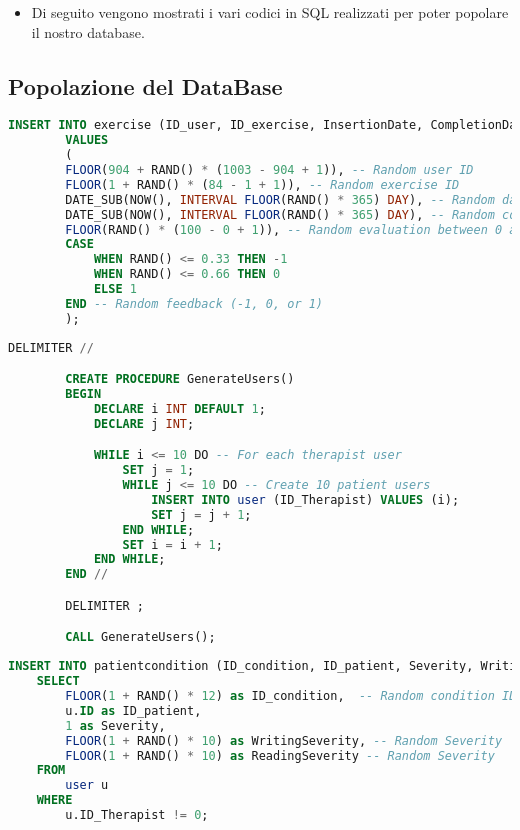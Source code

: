 \documentclass{article}
\begin{document}
    \begin{itemize}
        \item Di seguito vengono mostrati i vari codici in SQL realizzati per poter popolare il nostro database.
    \end{itemize}

    
    \pagebreak

    \subsection{Popolazione del DataBase}

\begin{lstlisting}[language=SQL, caption=Generazione Casuale esecuzione esercizio]
    INSERT INTO exercise (ID_user, ID_exercise, InsertionDate, CompletionDate, Evaluation, Feedback)
        VALUES
        (
        FLOOR(904 + RAND() * (1003 - 904 + 1)), -- Random user ID
        FLOOR(1 + RAND() * (84 - 1 + 1)), -- Random exercise ID
        DATE_SUB(NOW(), INTERVAL FLOOR(RAND() * 365) DAY), -- Random date 
        DATE_SUB(NOW(), INTERVAL FLOOR(RAND() * 365) DAY), -- Random completion date 
        FLOOR(RAND() * (100 - 0 + 1)), -- Random evaluation between 0 and 100
        CASE
            WHEN RAND() <= 0.33 THEN -1
            WHEN RAND() <= 0.66 THEN 0
            ELSE 1
        END -- Random feedback (-1, 0, or 1)
        );
    \end{lstlisting}

    \begin{lstlisting}[language=SQL, caption=Generazione degli utenti]
        DELIMITER //

        CREATE PROCEDURE GenerateUsers()
        BEGIN
            DECLARE i INT DEFAULT 1;
            DECLARE j INT;

            WHILE i <= 10 DO -- For each therapist user
                SET j = 1;
                WHILE j <= 10 DO -- Create 10 patient users
                    INSERT INTO user (ID_Therapist) VALUES (i); 
                    SET j = j + 1;
                END WHILE;
                SET i = i + 1;
            END WHILE;
        END //

        DELIMITER ;

        CALL GenerateUsers();
    \end{lstlisting}

    \pagebreak

\begin{lstlisting}[language=SQL, caption=Generazione delle Writing e Reading severity (tutti i pazienti)]
    INSERT INTO patientcondition (ID_condition, ID_patient, Severity, WritingSeverity, ReadingSeverity)
    SELECT
        FLOOR(1 + RAND() * 12) as ID_condition,  -- Random condition ID (1 to 12)
        u.ID as ID_patient,
        1 as Severity,
        FLOOR(1 + RAND() * 10) as WritingSeverity, -- Random Severity
        FLOOR(1 + RAND() * 10) as ReadingSeverity -- Random Severity
    FROM
        user u
    WHERE
        u.ID_Therapist != 0;
\end{lstlisting}
\end{document}
